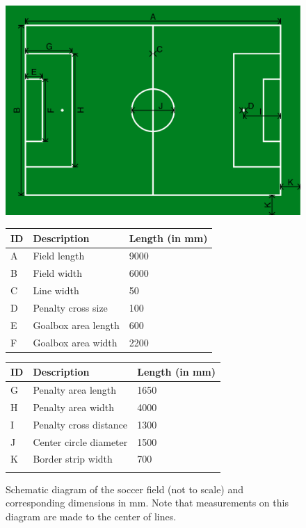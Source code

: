 \begin{figure}[b!]
\centering
\centerline{\includegraphics[width=\columnwidth]{figs/fieldDimensions2020.pdf}}
\vspace{1ex}
\begin{tabular}{| l | l | l |}
ID & Description & Length (in mm) \\
\hline \hline
A & Field length & 9000 \\
\hline
B & Field width & 6000 \\
\hline
C & Line width & 50 \\
\hline
D & Penalty cross size & 100 \\
\hline
E & Goalbox area length & 600 \\
\hline
F & Goalbox area width & 2200 \\
\end{tabular}
\begin{tabular}{|l|l|l|}
ID & Description & Length (in mm) \\
\hline \hline
G & Penalty area length & 1650 \\
\hline
H & Penalty area width & 4000 \\
\hline
I & Penalty cross distance & 1300 \\
\hline
J & Center circle diameter & 1500 \\
\hline
K & Border strip width & 700 \\
\hline
 &  &  \\
\end{tabular}
\caption{Schematic diagram of the soccer field (not to scale) and corresponding dimensions in mm.  Note that measurements on this diagram are made to the center of lines.}
\label{fig:field_dim}
\end{figure}


